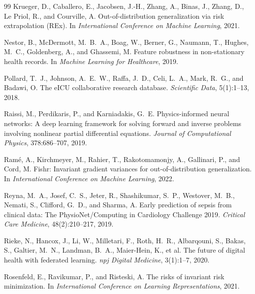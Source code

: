 \documentclass{article}
\begin{document}
{\begin{thebibliography}{99}
Krueger, D., Caballero, E., Jacobsen, J.-H., Zhang, A., Binas, J., Zhang, D., Le Priol, R., and Courville, A.
\newblock Out-of-distribution generalization via risk extrapolation (REx).
\newblock In \emph{International Conference on Machine Learning}, 2021.

Nestor, B., McDermott, M.~B.~A., Boag, W., Berner, G., Naumann, T., Hughes, M.~C., Goldenberg, A., and Ghassemi, M.
\newblock Feature robustness in non-stationary health records.
\newblock In \emph{Machine Learning for Healthcare}, 2019.

Pollard, T.~J., Johnson, A.~E.~W., Raffa, J.~D., Celi, L.~A., Mark, R.~G., and Badawi, O.
\newblock The eICU collaborative research database.
\newblock \emph{Scientific Data}, 5(1):1--13, 2018.

Raissi, M., Perdikaris, P., and Karniadakis, G.~E.
\newblock Physics-informed neural networks: A deep learning framework for solving forward and inverse problems involving nonlinear partial differential equations.
\newblock \emph{Journal of Computational Physics}, 378:686--707, 2019.

Ram\'{e}, A., Kirchmeyer, M., Rahier, T., Rakotomamonjy, A., Gallinari, P., and Cord, M.
\newblock Fishr: Invariant gradient variances for out-of-distribution generalization.
\newblock In \emph{International Conference on Machine Learning}, 2022.

Reyna, M.~A., Josef, C.~S., Jeter, R., Shashikumar, S.~P., Westover, M.~B., Nemati, S., Clifford, G.~D., and Sharma, A.
\newblock Early prediction of sepsis from clinical data: The {PhysioNet/Computing in Cardiology Challenge 2019}.
\newblock \emph{Critical Care Medicine}, 48(2):210--217, 2019.

Rieke, N., Hancox, J., Li, W., Milletari, F., Roth, H.~R., Albarqouni, S., Bakas, S., Galtier, M.~N., Landman, B.~A., Maier-Hein, K., et al.
\newblock The future of digital health with federated learning.
\newblock \emph{npj Digital Medicine}, 3(1):1--7, 2020.

Rosenfeld, E., Ravikumar, P., and Risteski, A.
\newblock The risks of invariant risk minimization.
\newblock In \emph{International Conference on Learning Representations}, 2021.


\end{thebibliography}}
\end{document}
